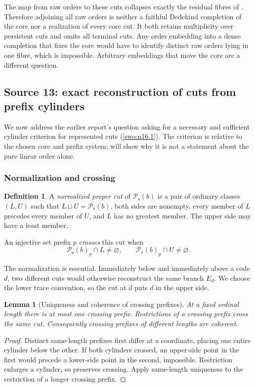 \documentclass[11pt]{article}
\newtheorem{lemma}[lemma]{Lemma}
\theoremstyle{definition}
\newtheorem{definition}[definition]{Definition}
\theoremstyle{remark}
\newcommand{\Psupp}{\mathcal P_{\mathrm{s}}}
\begin{document}
The map from raw orders to these cuts collapses exactly the residual
fibres of . Therefore adjoining all raw orders
is neither a faithful Dedekind completion of the core nor a realization
of every core cut. It both retains multiplicity over persistent cuts
and omits all terminal cuts. Any order embedding into a dense completion
that fixes the core would have to identify distinct raw orders lying in
one fibre, which is impossible. Arbitrary embeddings that move the core
are a different question.

\subsection{Source 13: exact reconstruction of cuts from prefix cylinders}\label{swo:fs:sec:cuts}

We now address the earlier report's question asking for a necessary
and sufficient cylinder criterion for represented cuts
(\cref{swo:n16.1}). The criterion is relative
to the chosen core and prefix system; 
will show why it is not a statement about the pure linear order alone.

\subsubsection{Normalization and crossing}

\begin{definition}\label{swo:fs:def:cut}
A \emph{normalized proper cut} of $\Psupp(b)$ is a pair of ordinary classes
$(L,U)$ such that $L\sqcup U=\Psupp(b)$, both sides are nonempty, every
member of $L$ precedes every member of $U$, and $L$ has no greatest
member. The upper side may have a least member.

An injective set prefix $p$ \emph{crosses} this cut when
\[
                         \Psupp(b)_p\cap L\ne\varnothing,
             \qquad      \Psupp(b)_p\cap U\ne\varnothing.
\]
\end{definition}

The normalization is essential. Immediately below and immediately above
a code $d$, two different cuts would otherwise reconstruct the same
branch $E_d$. We choose the lower trace convention, so the cut at $d$
puts $d$ in the upper side.

\begin{lemma}[Uniqueness and coherence of crossing prefixes]\label{swo:fs:lem:crossing}
At a fixed ordinal length there is at most one crossing prefix.
Restrictions of a crossing prefix cross the same cut. Consequently
crossing prefixes of different lengths are coherent.
\end{lemma}
\begin{proof}
Distinct same-length prefixes first differ at a coordinate, placing
one entire cylinder below the other. If both cylinders crossed, an
upper-side point in the first would precede a lower-side point in the
second, impossible. Restriction enlarges a cylinder, so preserves
crossing. Apply same-length uniqueness to the restriction of a longer
crossing prefix.
\end{proof}
\end{document}
